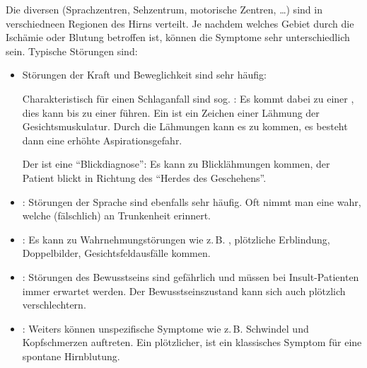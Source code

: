 {%
\label{topic:hirndruckzeichen}
Die diversen 
(Sprachzentren, Sehzentrum, motorische Zentren, \ldots)
sind in verschiedneen Regionen des Hirns verteilt. Je
nachdem welches Gebiet durch die Ischämie oder Blutung
betroffen ist, können die Symptome sehr unterschiedlich
sein.  Typische Störungen sind:

\begin{itemize}
  \item {} Störungen der Kraft und Beweglichkeit
  sind sehr häufig:
  
  Charakteristisch für einen
  Schlaganfall sind sog. : Es kommt
  dabei zu einer , dies kann
  bis zu einer  führen. Ein
   ist ein Zeichen einer
  Lähmung der
  Gesichtsmuskulatur. Durch die Lähmungen kann es zu
   kommen, es besteht dann eine erhöhte
  Aspirationsgefahr.
  
  Der  ist eine \enquote{Blickdiagnose}: Es kann zu
  Blicklähmungen kommen, der Patient blickt in Richtung des
  \enquote{Herdes des Geschehens}.
  
  \item {}: Störungen der Sprache sind ebenfalls
  sehr häufig. Oft nimmt man eine  wahr,
  welche (fälschlich) an Trunkenheit erinnert. 
  
  \item {}:
  Es kann zu Wahrnehmungstörungen wie z.\,B.
  , plötzliche Erblindung, Doppelbilder,
  Gesichtsfeldausfälle kommen.
  
  \item {}: Störungen des Bewusstseins sind
  gefährlich und müssen bei Insult-Patienten immer erwartet
  werden. Der Bewusstseinszustand kann sich auch plötzlich
  verschlechtern.
  
  \item {}: Weiters können unspezifische
  Symptome wie z.\,B. Schwindel und Kopfschmerzen auftreten. Ein
  plötzlicher,  ist ein
  klassisches Symptom für eine spontane Hirnblutung.
  

\end{itemize}}
